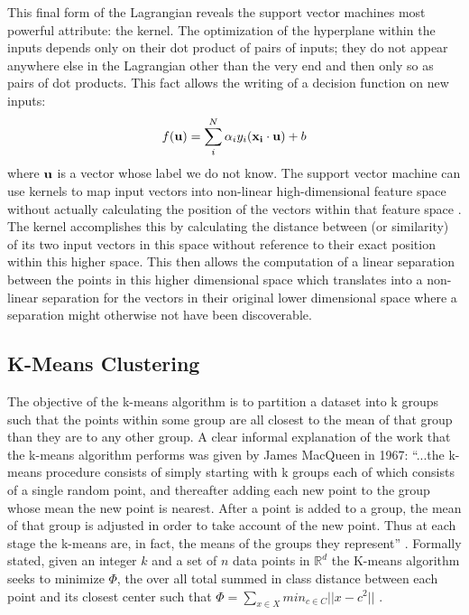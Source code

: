 This final form of the Lagrangian reveals the support vector machines most
powerful attribute: the kernel. The optimization of the hyperplane within the
inputs depends only on their dot product of pairs of inputs; they do not appear
anywhere else in the Lagrangian other than the very end and then only so as
pairs of dot products. This fact allows the writing of a decision function on
new inputs: $$f(\bold{u}) = \sum_{i}^{N}\alpha_{i}y_{i}(\bold{x_i}\cdot\bold{u})+b$$
where $\bold{u}$ is a vector whose label we do not know. The support vector
machine can use kernels to map input vectors into
non-linear high-dimensional feature space without actually calculating the
position of the vectors within that feature space \cite{Vapnik}. The kernel
accomplishes this by calculating the distance between (or similarity) of its two
input vectors in this space without reference to their exact position within
this higher space. This then allows the computation of a linear separation
between the points in this higher dimensional space which translates into a
non-linear separation for the vectors in their original lower dimensional space
where a separation might otherwise not have been discoverable.
\subsection{K-Means Clustering}
The objective of the k-means algorithm is to partition a dataset into k groups
such that the points within some group are all closest to
the mean of that group than they are to any other group. A clear
informal explanation of the work that the k-means algorithm performs
was given by James MacQueen in 1967: ``...the k-means procedure
consists of simply starting with k groups each of which consists of a
single random point, and thereafter adding each new point to the
group whose mean the new point is nearest. After a point is added to
a group, the mean of that group is adjusted in order to take account
of the new point. Thus at each stage the k-means are, in fact, the
means of the groups they represent'' \cite{MacQueen}. Formally stated,
given an integer $k$ and a set of $n$ data points in
$\mathbb{R}^{d}$ the K-means algorithm seeks to minimize  $\Phi$, the
over all total summed in class distance between each point and its
closest center such that $\Phi = \sum_{x \in X} min_{c \in C}||{x-c^{2}}||$
\cite{Arthur}.

